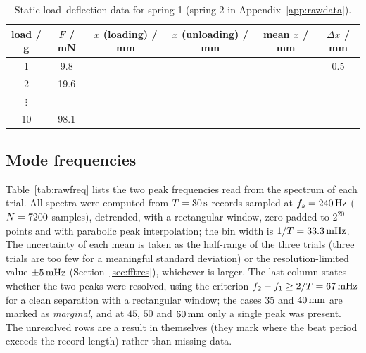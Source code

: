 \begin{table}[htbp]
\centering\small
\caption{Static load--deflection data for spring 1 (spring 2 in Appendix~\ref{app:rawdata}). }
\label{tab:static}
\begin{tabular}{@{}cccccc@{}}
\toprule
load / g & $F$ / mN & $x$ (loading) / mm & $x$ (unloading) / mm & mean $x$ / mm & $\Delta x$ / mm\\
\midrule
1 & 9.8 & \TBM{} & \TBM{} & \TBM{} & 0.5\\
2 & 19.6 & & & & \\
$\vdots$ & & & & & \\
10 & 98.1 & & & & \\
\bottomrule
\end{tabular}
\end{table}

\subsection{Mode frequencies}

Table~\ref{tab:rawfreq} lists the two peak frequencies read from the spectrum of each trial. All spectra were computed from $T=30\,\mathrm{s}$ records sampled at $f_s=240\,\mathrm{Hz}$ ($N=7200$ samples), detrended, with a rectangular window, zero-padded to $2^{20}$ points and with parabolic peak interpolation; the bin width is $1/T=33.3\,\mathrm{mHz}$. The uncertainty of each mean is taken as the half-range of the three trials (three trials are too few for a meaningful standard deviation) or the resolution-limited value $\pm5\,\mathrm{mHz}$ (Section~\ref{sec:fftres}), whichever is larger. The last column states whether the two peaks were resolved, using the criterion $f_2-f_1\geq2/T=67\,\mathrm{mHz}$ for a clean separation with a rectangular window; the cases $35$ and $40\,\mathrm{mm}$ are marked as \emph{marginal}, and at $45$, $50$ and $60\,\mathrm{mm}$ only a single peak was present. The unresolved rows are a result in themselves (they mark where the beat period exceeds the record length) rather than missing data.

